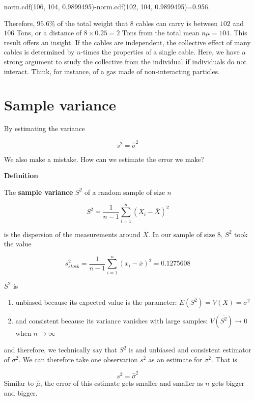 \documentclass[
]{book}
\providecommand{\tightlist}{%
  \setlength{\itemsep}{0pt}\setlength{\parskip}{0pt}}
\begin{document}
norm.cdf(106, 104, 0.9899495)-norm.cdf(102, 104, 0.9899495)=0.956.

Therefore, \(95.6\%\) of the total weight that \(8\) cables can carry is between \(102\) and \(106\) Tons, or a distance of \(8\times0.25=2\) Tons from the total mean \(n\mu=104\). This result offers an insight. If the cables are independent, the collective effect of many cables is determined by \(n\)-times the properties of a single cable. Here, we have a strong argument to study the collective from the individual \textbf{if} individuals do not interact. Think, for instance, of a gas made of non-interacting particles.

\hypertarget{sample-variance-1}{%
\section{Sample variance}\label{sample-variance-1}}

By estimating the variance

\[s^2=\hat{\sigma}^2\]

We also make a mistake. How can we estimate the error we make?

\textbf{Definition}

The \textbf{sample variance} \(S^2\) of a random sample of size \(n\)

\[S^2= \frac{1}{n-1}\sum_{i=1}^n(X_i-\bar{X})^2\]

is the dispersion of the measurements around \(\bar{X}\). In our sample of size \(8\), \(S^2\) took the value

\[s_{stock}^2=\frac{1}{n-1}\sum_{i=1}^n(x_i-\bar{x})^2=0.1275608\]

\(S^2\) is

\begin{enumerate}
\def\labelenumi{\arabic{enumi})}
\tightlist
\item
  unbiased because its expected value is the parameter: \(E(S^2)=V(X)=\sigma^2\)
\item
  and consistent because its variance vanishes with large samples: \(V(\bar{S^2}) \rightarrow 0\) when \(n \rightarrow \infty\)
\end{enumerate}

and therefore, we technically say that \(S^2\) is and unbiased and consistent estimator of \(\sigma^2\). We can therefore take one observation \(s^2\) as an estimate for \(\sigma^2\). That is

\[s^2=\hat{\sigma}^2\]
Similar to \(\hat{\mu}\), the error of this estimate gets smaller and smaller as \(n\) gets bigger and bigger.
\end{document}
